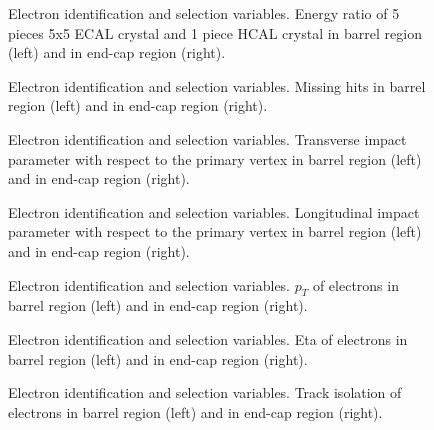 \documentclass[12pt]{article} %
\begin{document}
\begin{figure}[H] %
  \caption{Electron identification and selection variables. Energy ratio of 5 pieces 5x5 ECAL crystal and 1 piece HCAL crystal in barrel region (left) and in end-cap region (right).}
  \label{fig:eleVariable01}
\end{figure}

\begin{figure}[H] %
  \caption{Electron identification and selection variables. Missing hits in barrel region (left) and in end-cap region (right).}
  \label{fig:eleVariable02}
\end{figure}

\begin{figure}[H] %
  \caption{Electron identification and selection variables. Transverse impact parameter with respect to the primary vertex in barrel region (left) and in end-cap region (right).}
  \label{fig:eleVariable03}
\end{figure}

\begin{figure}[H] %
  \caption{Electron identification and selection variables. Longitudinal impact parameter with respect to the primary vertex in barrel region (left) and in end-cap region (right).}
  \label{fig:eleVariable04}
\end{figure}

\begin{figure}[H] %
  \caption{Electron identification and selection variables. $p_T$ of electrons in barrel region (left) and in end-cap region (right).}
  \label{fig:eleVariable05}
\end{figure}

\begin{figure}[H] %
  \caption{Electron identification and selection variables. Eta of electrons in barrel region (left) and in end-cap region (right).}
  \label{fig:eleVariable06}
\end{figure}

\begin{figure}[H] %
  \caption{Electron identification and selection variables. Track isolation of electrons in barrel region (left) and in end-cap region (right).}
  \label{fig:eleVariable07}
\end{figure}
\end{document}
